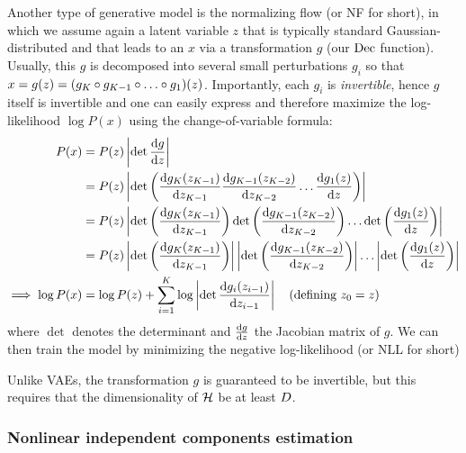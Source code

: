 \documentclass[../main.tex]{subfiles}
\begin{document}
Another type of generative model is the normalizing flow (or NF for short), in which we assume again a latent variable $z$ that is typically standard Gaussian-distributed and that leads to an $x$ via a transformation $g$ (our $\operatorname{Dec}$ function).
Usually, this $g$ is decomposed into several small perturbations $g_i$ so that $x = g(z) = (g_K \circ g_{K-1} \circ \ldots \circ g_1) (z)$.
Importantly, each $g_i$ is \emph{invertible}, hence $g$ itself is invertible and one can easily express and therefore maximize the log-likelihood $\log P(x)$ using the change-of-variable formula:
%
\begin{align*}
    P(x)               & = P(z) \left\lvert \det \frac{\mathrm{d} g}{\mathrm{d} z} \right\rvert       \\
                       & = P(z) \left\lvert \det \left(
        \frac{\mathrm{d} g_K(z_{K-1})}{\mathrm{d} z_{K-1}}
        \frac{\mathrm{d} g_{K-1}(z_{K-2})}{\mathrm{d} z_{K-2}}
        \ldots
        \frac{\mathrm{d} g_1(z)}{\mathrm{d} z}
    \right)\right\rvert                                                   \\
                       & = P(z) \left\lvert
        \det \left(
        \frac{\mathrm{d} g_K(z_{K-1})}{\mathrm{d} z_{K-1}}
        \right)
        \det \left(
        \frac{\mathrm{d} g_{K-1}(z_{K-2})}{\mathrm{d} z_{K-2}}
        \right)
        \ldots
        \det \left(
        \frac{\mathrm{d} g_1(z)}{\mathrm{d} z}
        \right)
    \right\rvert                                                          \\
                       & = P(z) \left\lvert
        \det \left(
        \frac{\mathrm{d} g_K(z_{K-1})}{\mathrm{d} z_{K-1}}
        \right)
    \right\rvert
    \left\lvert
        \det \left(
        \frac{\mathrm{d} g_{K-1}(z_{K-2})}{\mathrm{d} z_{K-2}}
        \right)
    \right\rvert
    \ldots
    \left\lvert
        \det \left(
        \frac{\mathrm{d} g_1(z)}{\mathrm{d} z}
        \right)
    \right\rvert                                                          \\
    \implies \log P(x) & = \log P(z) + \sum_{i=1}^K \log \left\lvert
        \det \frac{\mathrm{d} g_i(z_{i-1})}{\mathrm{d} z_{i-1}}
    \right\rvert\quad \text{(defining $z_0 = z$)}
\end{align*}
where $\det$ denotes the determinant and $\frac{\mathrm{d} g}{\mathrm{d} z}$ the Jacobian matrix of $g$.
We can then train the model by minimizing the negative log-likelihood (or NLL for short)

Unlike VAEs, the transformation $g$ is guaranteed to be invertible, but this requires that the dimensionality of $\mathcal{H}$ be at least $D$.

\subsubsection{Nonlinear independent components estimation}
\end{document}
